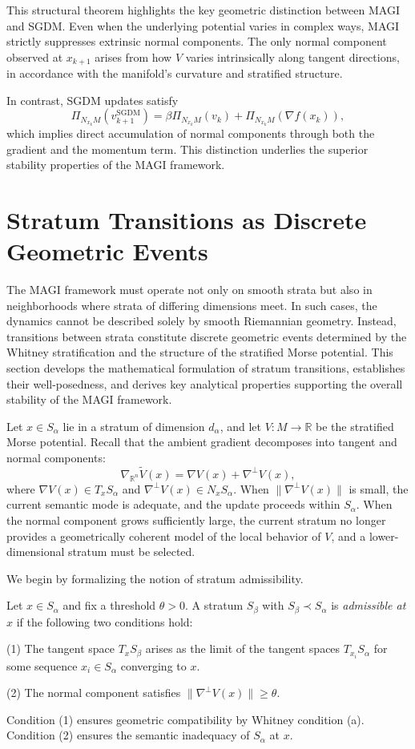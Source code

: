 \documentclass[12pt]{article}
\begin{document}
This structural theorem highlights the key geometric distinction between MAGI and SGDM. Even when the underlying potential varies in complex ways, MAGI strictly suppresses extrinsic normal components. The only normal component observed at $x_{k+1}$ arises from how $V$ varies intrinsically along tangent directions, in accordance with the manifold’s curvature and stratified structure.

In contrast, SGDM updates satisfy
\[
\Pi_{N_{x_k}M}(v_{k+1}^{\mathrm{SGDM}})
=
\beta \Pi_{N_{x_k}M}(v_k)
+
\Pi_{N_{x_k}M}(\nabla f(x_k)),
\]
which implies direct accumulation of normal components through both the gradient and the momentum term. This distinction underlies the superior stability properties of the MAGI framework.

\section{Stratum Transitions as Discrete Geometric Events}

The MAGI framework must operate not only on smooth strata but also in neighborhoods where strata of differing dimensions meet. In such cases, the dynamics cannot be described solely by smooth Riemannian geometry. Instead, transitions between strata constitute discrete geometric events determined by the Whitney stratification and the structure of the stratified Morse potential. This section develops the mathematical formulation of stratum transitions, establishes their well-posedness, and derives key analytical properties supporting the overall stability of the MAGI framework.

Let $x \in S_\alpha$ lie in a stratum of dimension $d_\alpha$, and let $V : M \to \mathbb{R}$ be the stratified Morse potential. Recall that the ambient gradient decomposes into tangent and normal components:
\[
\nabla_{\mathbb{R}^n}\widetilde{V}(x)
=
\nabla V(x) + \nabla^\perp V(x),
\]
where $\nabla V(x) \in T_x S_\alpha$ and $\nabla^\perp V(x) \in N_x S_\alpha$. When $\|\nabla^\perp V(x)\|$ is small, the current semantic mode is adequate, and the update proceeds within $S_\alpha$. When the normal component grows sufficiently large, the current stratum no longer provides a geometrically coherent model of the local behavior of $V$, and a lower-dimensional stratum must be selected.

We begin by formalizing the notion of stratum admissibility.

\begin{definition}
Let $x \in S_\alpha$ and fix a threshold $\theta > 0$. A stratum $S_\beta$ with $S_\beta \prec S_\alpha$ is \emph{admissible at $x$} if the following two conditions hold:

(1) The tangent space $T_x S_\beta$ arises as the limit of the tangent spaces $T_{x_i} S_\alpha$ for some sequence $x_i \in S_\alpha$ converging to $x$.

(2) The normal component satisfies $\|\nabla^\perp V(x)\| \ge \theta$.

Condition (1) ensures geometric compatibility by Whitney condition (a). Condition (2) ensures the semantic inadequacy of $S_\alpha$ at $x$.
\end{definition}
\end{document}
